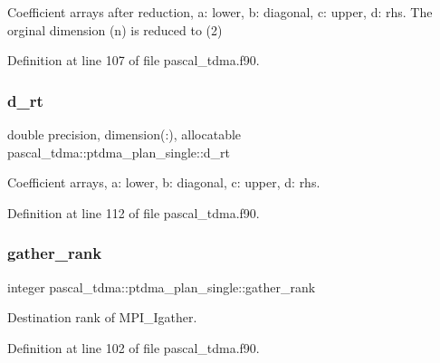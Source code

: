 Coefficient arrays after reduction, a\+: lower, b\+: diagonal, c\+: upper, d\+: rhs. The orginal dimension (n) is reduced to (2) 



Definition at line 107 of file pascal\+\_\+tdma.\+f90.

\mbox{\label{structpascal__tdma_1_1ptdma__plan__single_a627be8624cd48aa5b3aad7f6cf8d0b08}} 
\subsubsection{\texorpdfstring{d\_rt}{d\_rt}}
{\footnotesize\ttfamily double precision, dimension(\+:), allocatable pascal\+\_\+tdma\+::ptdma\+\_\+plan\+\_\+single\+::d\+\_\+rt}



Coefficient arrays, a\+: lower, b\+: diagonal, c\+: upper, d\+: rhs. 



Definition at line 112 of file pascal\+\_\+tdma.\+f90.

\mbox{\label{structpascal__tdma_1_1ptdma__plan__single_af0d3b3bce8b9956aa9e80ba0712a9a9d}} 
\subsubsection{\texorpdfstring{gather\_rank}{gather\_rank}}
{\footnotesize\ttfamily integer pascal\+\_\+tdma\+::ptdma\+\_\+plan\+\_\+single\+::gather\+\_\+rank}



Destination rank of M\+P\+I\+\_\+\+Igather. 



Definition at line 102 of file pascal\+\_\+tdma.\+f90.

\mbox{\label{structpascal__tdma_1_1ptdma__plan__single_af473533b36508af4e0752cee8d182334}} 
